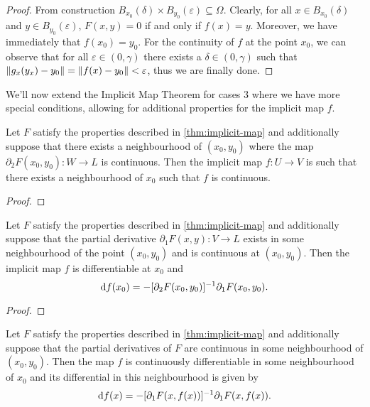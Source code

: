 \begin{proof}
    From construction
    \(B_{x_0}(\delta) \times B_{y_0}(\varepsilon) \subseteq \Omega\). Clearly, for
    all \(x \in B_{x_0}(\delta)\) and \(y \in B_{y_0}(\varepsilon)\),
    \(F(x, y) = 0\) if and only if \(f(x) = y\). Moreover, we have immediately that
    \(f(x_0) = y_0\). For the continuity of \(f\) at the point \(x_0\), we can
    observe that for all \(\varepsilon \in (0, \gamma)\) there exists a
    \(\delta \in (0, \gamma)\) such that
    \(\lVert g_x(y_x) - y_0\rVert = \lVert f(x) - y_0\rVert < \varepsilon\), thus we are finally
    done.
\end{proof}

We'll now extend the Implicit Map Theorem for cases 3 where we have more
special conditions, allowing for additional properties for the implicit map
\(f\).

\begin{lemma}
    \label{lem:continuity-implicit-map}
    Let \(F\) satisfy the properties described in \cref{thm:implicit-map} and
    additionally suppose that there exists a neighbourhood of \((x_0, y_0)\) where
    the map \(\partial_2F(x_0, y_0): W \to L\) is continuous. Then the implicit map \(f: U
    \to V\) is such that there exists a neighbourhood of \(x_0\) such that \(f\) is
    continuous.
\end{lemma}

\begin{proof}

\end{proof}


\begin{lemma}
    \label{lem:differential-implicit-map}
    Let \(F\) satisfy the properties described in \cref{thm:implicit-map} and
    additionally suppose that the partial derivative \(\partial_1F(x, y): V \to L\)
    exists in some neighbourhood of the point \((x_0, y_0)\) and is continuous at
    \((x_0, y_0)\). Then the implicit map \(f\) is differentiable at \(x_0\) and
    \[
        \mathrm{d} f(x_0) = - [\partial_2F(x_0, y_0)]^{-1} \partial_1 F(x_{0}, y_0).
    \]
\end{lemma}

\begin{proof}

\end{proof}

\begin{lemma}
    \label{lem:continuous-diff-implicit-map}
    Let \(F\) satisfy the properties described in \cref{thm:implicit-map} and
    additionally suppose that the partial derivatives of \(F\) are continuous in
    some neighbourhood of \((x_0, y_0)\). Then the map \(f\) is continuously
    differentiable in some neighbourhood of \(x_0\) and its differential in this
    neighbourhood is given by
    \[
        \mathrm{d} f(x) = - [\partial_1F(x, f(x))]^{-1} \partial_1F(x, f(x)).
    \]
\end{lemma}

